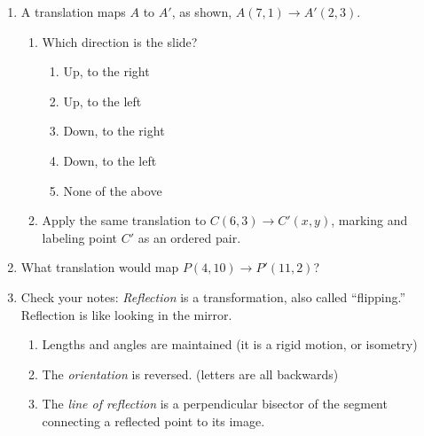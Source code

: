 \begin{enumerate}
\item A translation maps $A$ to $A'$, as shown, $A(7,1) \rightarrow A'(2,3)$.
\begin{multicols}{2}
  \begin{enumerate}
    \item Which direction is the slide?
    \begin{enumerate}[label=(\Alph*)]
      \item Up, to the right
      \item Up, to the left
      \item Down, to the right
      \item Down, to the left
      \item None of the above
    \end{enumerate} \vspace{0.5cm}
    \item Apply the same translation to $C(6,3)\rightarrow C'(x,y)$, marking and labeling point $C'$ as an ordered pair.
    \end{enumerate}
    \begin{flushright}
    \end{flushright}
  \end{multicols}

\item What translation would map $P(4,10)\rightarrow P'(11,2)$?

\newpage
\item Check your notes: \emph{Reflection} is a transformation, also called ``flipping.'' Reflection is like looking in the mirror.
  \begin{enumerate}
    \item Lengths and angles are maintained (it is a rigid motion, or isometry)
    \item The \emph{orientation} is reversed. (letters are all backwards)
    \item The \emph{line of reflection} is a perpendicular bisector of the segment connecting a reflected point to its image.
  \end{enumerate}
  \begin{flushright}
  \end{flushright}
  

\end{enumerate}
